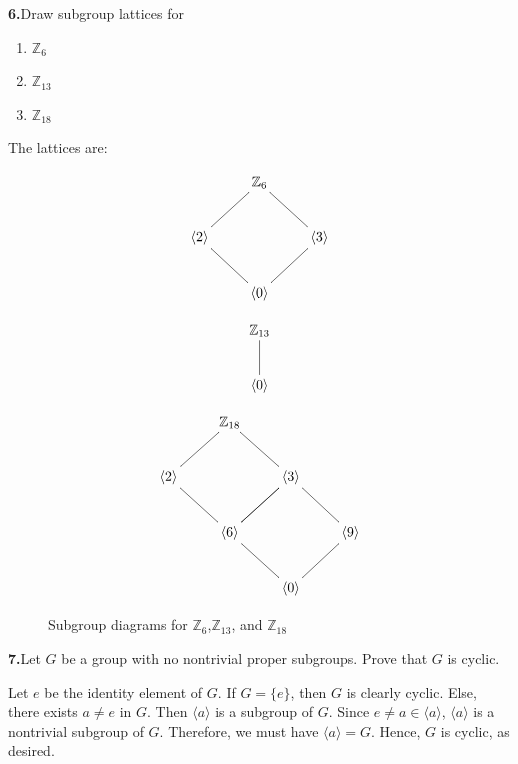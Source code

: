 \documentclass[10pt,]{book}
\theoremstyle{plain}
\theoremstyle{definition}
\theoremstyle{definition}
\theoremstyle{definition}
\theoremstyle{definition}
\numberwithin{equation}{section}
\def\Z{\mathbb{Z}}
\begin{document}
\par\smallskip
\noindent\textbf{6.}\quad{}Draw subgroup lattices for \leavevmode%
\begin{enumerate}[label=(\alph*)]
\item\hypertarget{li-255}{}\(\Z_6\)%
\item\hypertarget{li-256}{}\(\Z_{13}\)%
\item\hypertarget{li-257}{}\(\Z_{18}\)%
\end{enumerate}
%
\par\smallskip
The lattices are:%
\begin{figure}
\centering
{
    \[\xymatrix{&\Z_6&\\ \langle 2\rangle \ar@{-}[ur]&&\langle 3\rangle\ar@{-}[ul]\\&\langle 0\rangle \ar@{-}[ul]\ar@{-}[ur]&}\]

 \[\xymatrix{\Z_{13}\ar@{-}[d]\\ \langle0\rangle}\]

\[ \xymatrix{&\Z_{18}&&\\ \langle 2\rangle\ar@{-}[ur]\ar@{-}[dr]&&\langle 3\rangle\ar@{-}[ul]\ar@{-}[dl]&\\
&\langle 6 \rangle \ar@{-}[dr]\ar@{-}[ur]&& \langle 9 \rangle \ar@{-}[dl]\ar@{-}[ul]\\&& \langle 0 \rangle &}\]
}
\caption{Subgroup diagrams for \(\Z_6\),\(\Z_{13}\), and \(\Z_{18}\)\label{figure-6}}
\end{figure}
\par\smallskip
\noindent\textbf{7.}\quad{}Let \(G\) be a group with no nontrivial proper subgroups. Prove that \(G\) is cyclic.%
\par\smallskip
Let \(e\) be the identity element of \(G\). If \(G=\{e\}\), then \(G\) is clearly cyclic. Else, there exists \(a\neq e\) in \(G\). Then \(\langle a\rangle\) is a subgroup of \(G\). Since \(e\neq a\in
\langle a\rangle\), \(\langle a\rangle\) is a nontrivial subgroup of \(G\). Therefore, we must have \(\langle a\rangle =G\). Hence, \(G\) is cyclic, as desired.%
\par\smallskip
\end{document}

